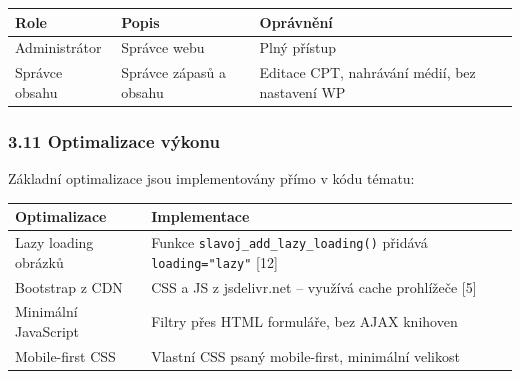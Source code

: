 {\def\LTcaptype{none} %
\begin{longtable}[]{@{}
  >{\raggedright\arraybackslash}p{}
  >{\raggedright\arraybackslash}p{}
  >{\raggedright\arraybackslash}p{}@{}}
\toprule\noalign{}
\begin{minipage}[b]{\linewidth}\raggedright
Role
\end{minipage} & \begin{minipage}[b]{\linewidth}\raggedright
Popis
\end{minipage} & \begin{minipage}[b]{\linewidth}\raggedright
Oprávnění
\end{minipage} \\
\midrule\noalign{}
\endhead
\bottomrule\noalign{}
\endlastfoot
Administrátor & Správce webu & Plný přístup \\
Správce obsahu & Správce zápasů a obsahu & Editace CPT, nahrávání médií,
bez nastavení WP \\
\end{longtable}
}

\subsubsection{3.11 Optimalizace výkonu}\label{optimalizace-vuxfdkonu}

Základní optimalizace jsou implementovány přímo v kódu tématu:

{\def\LTcaptype{none} %
\begin{longtable}[]{@{}
  >{\raggedright\arraybackslash}p{}
  >{\raggedright\arraybackslash}p{}@{}}
\toprule\noalign{}
\begin{minipage}[b]{\linewidth}\raggedright
Optimalizace
\end{minipage} & \begin{minipage}[b]{\linewidth}\raggedright
Implementace
\end{minipage} \\
\midrule\noalign{}
\endhead
\bottomrule\noalign{}
\endlastfoot
Lazy loading obrázků & Funkce \texttt{slavoj\_add\_lazy\_loading()}
přidává \texttt{loading="lazy"} {[}12{]} \\
Bootstrap z CDN & CSS a JS z jsdelivr.net -- využívá cache prohlížeče
{[}5{]} \\
Minimální JavaScript & Filtry přes HTML formuláře, bez AJAX knihoven \\
Mobile-first CSS & Vlastní CSS psaný mobile-first, minimální velikost \\
\end{longtable}
}

